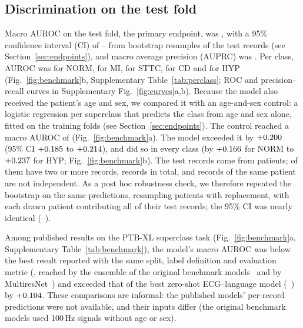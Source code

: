 \subsection{Discrimination on the test fold}
Macro AUROC on the test fold, the primary endpoint, was \MainAUROC, with a 95\% confidence interval (CI) of
\MainAUROCLow--\MainAUROCHigh{} from \NBoot{} bootstrap resamples of the test records (see Section~\ref{sec:endpoints}), and macro average
precision (AUPRC) was \MainAUPRC. Per class, AUROC was \MainNORM{}
for NORM, \MainMI{} for MI, \MainSTTC{} for STTC, \MainCD{} for CD and \MainHYP{} for HYP (Fig.~\ref{fig:benchmark}b,
Supplementary Table~\ref{tab:perclass}; ROC and precision--recall curves in Supplementary Fig.~\ref{fig:curves}a,b).
Because the model also received the patient's age and sex, we compared it with an age-and-sex control: a logistic
regression per superclass that predicts the class from age and sex alone, fitted on the training folds (see Section~\ref{sec:endpoints}).
The control reached a macro AUROC of \AgeSexAUROC{} (Fig.~\ref{fig:benchmark}a). The model exceeded it by
$+0.200$ (95\% CI $+0.185$ to $+0.214$), and did so in every class (by $+0.166$
for NORM to $+0.237$ for HYP; Fig.~\ref{fig:benchmark}b). The \NTest{} test records come from
\PHNPatientsTest{} patients; \PHNPatientsMulti{} of them have two or more records, \PHNRecordsMulti{} records in
total, and records of the same patient are not independent. As a post hoc robustness check, we therefore repeated the
bootstrap on the same predictions, resampling patients with replacement, with each drawn patient contributing all of
their test records; the 95\% CI was nearly identical (\PHClusterLow--\PHClusterHigh).

Among published results on the PTB-XL superclass task (Fig.~\ref{fig:benchmark}a, Supplementary
Table~\ref{tab:benchmark}), the model's macro AUROC was \GapToBestPublishedAbs{} below the best result reported with
the same split, label definition and evaluation metric (\BestPublishedAUROC, reached by the ensemble of the original
benchmark models~\citep{Strodthoff2021} and by MultiresNet~\citep{shi2023multires}) and exceeded that of the best zero-shot
ECG--language model (\BestZeroShotAUROC~\citep{cai2025supreme}) by $+0.104$. These comparisons are
informal: the published models' per-record predictions were not available, and their inputs differ (the original
benchmark models used 100\,Hz signals without age or sex).

